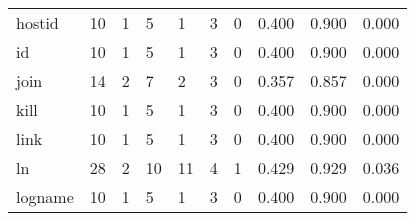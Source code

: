 \begin{longtable}{lp{1.3cm}p{1.3cm}p{1.3cm}p{1.3cm}p{1.3cm}p{1.3cm}p{1.3cm}p{1.3cm}p{1.3cm}}
hostid    &                     10 &                                             1 &                                            5 &                                           1 &                                            3 &                                          0 &                                0.400 &                                  0.900 &                                0.000 \\
id        &                     10 &                                             1 &                                            5 &                                           1 &                                            3 &                                          0 &                                0.400 &                                  0.900 &                                0.000 \\
join      &                     14 &                                             2 &                                            7 &                                           2 &                                            3 &                                          0 &                                0.357 &                                  0.857 &                                0.000 \\
kill      &                     10 &                                             1 &                                            5 &                                           1 &                                            3 &                                          0 &                                0.400 &                                  0.900 &                                0.000 \\
link      &                     10 &                                             1 &                                            5 &                                           1 &                                            3 &                                          0 &                                0.400 &                                  0.900 &                                0.000 \\
ln        &                     28 &                                             2 &                                           10 &                                          11 &                                            4 &                                          1 &                                0.429 &                                  0.929 &                                0.036 \\
logname   &                     10 &                                             1 &                                            5 &                                           1 &                                            3 &                                          0 &                                0.400 &                                  0.900 &                                0.000 \\

\end{longtable}
